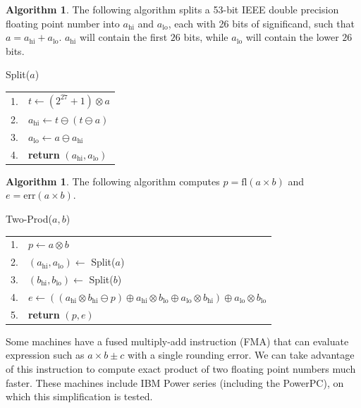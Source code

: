 \documentclass[11pt]{article}
\theoremstyle{definition}
\newtheorem{alg}[thm]{Algorithm}
\newcommand{\fl}{\mathrm{fl}}
\newcommand{\err}{\mathrm{err}}
\newcommand{\hi}{\mathrm{hi}}
\newcommand{\lo}{\mathrm{lo}}
\begin{document}
\begin{alg} \cite[p. 325]{she97}
  The following algorithm splits a 53-bit IEEE double precision
  floating point number into $a_{\hi}$ and $a_{\lo}$, each with 26 bits of 
  significand, such that $a = a_\hi + a_\lo$.  $a_\hi$ will contain 
  the first $26$ bits, while $a_\lo$ will contain the lower $26$ bits.

  \vspace{0.1in} \hfill
  \begin{minipage}[t]{4in}
    {\sc Split}($a$) \\
    \begin{tabular}{rl}
      1. & $t \leftarrow (2^{27}+1) \otimes a$ \\
      2. & $a_\hi \leftarrow t \ominus (t \ominus a)$ \\
      3. & $a_\lo \leftarrow a \ominus a_\hi$ \\
      4. & {\bf return} $(a_\hi, a_\lo)$
    \end{tabular}
  \end{minipage}
\end{alg}

\begin{alg} \cite[p. 326]{she97}
  The following algorithm computes $p = \fl(a \times b)$ and 
  $e = \err(a \times b)$.

  \vspace{0.1in} \hfill
  \begin{minipage}[t]{5in}
    {\sc Two-Prod}($a, b$) \\
    \begin{tabular}{rl}
      1. & $p \leftarrow a \otimes b$ \\
      2. & $(a_\hi, a_\lo) \leftarrow$ {\sc Split}($a$) \\
      3. & $(b_\hi, b_\lo) \leftarrow$ {\sc Split}($b$) \\
      4. & $e \leftarrow ((a_\hi \otimes b_\hi \ominus p) \oplus
             a_\hi \otimes b_\lo \oplus a_\lo \otimes b_\hi) \oplus
             a_\lo \otimes b_\lo$  \\
      5. & {\bf return} $(p, e)$
    \end{tabular}
  \end{minipage}  
\end{alg}

Some machines have a fused multiply-add instruction (FMA) that
can evaluate expression such as $a \times b \pm c$ with a single 
rounding error.  We can take advantage of this instruction to compute
exact product of two floating point numbers much faster.  These 
machines include IBM Power series (including the PowerPC), on which
this simplification is tested.
\end{document}
